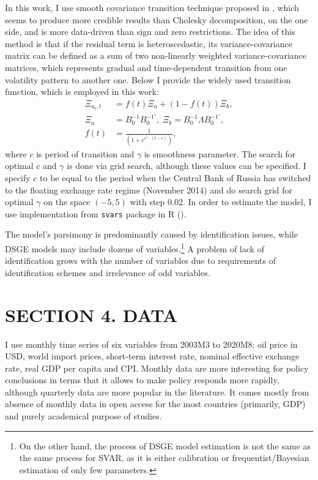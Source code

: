 \documentclass[12pt, a4paper]{extarticle}
\begin{document}
In this work, I use smooth covariance transition technique proposed in \cite{Luetkepohl2017}, which seems to produce more credible results than Cholesky decomposition, on the one side, and is more data-driven than sign and zero restrictions. The idea of this method is that if the residual term is heteroscedastic, its variance-covariance matrix can be defined as a sum of two non-linearly weighted variance-covariance matrices, which represents gradual and time-dependent transition from one volatility pattern to another one. Below I provide the widely used transition function, which is employed in this work:
\begin{align}
	\Xi_{u_t, t} &= f(t)\Xi_a + (1 - f(t))\Xi_b,\\
	\Xi_a &= B_0^{-1}B_0^{-1'}, \; \Xi_b = B_0^{-1}\Lambda B_0^{-1'},\\
	f(t) &= \frac{1}{(1 + e^{e^\gamma \cdot (t - c)})},
\end{align}
where $c$ is period of transition and $\gamma$ is smoothness parameter. The search for optimal $c$ and $\gamma$ is done via grid search, although these values can be specified. I specify $c$ to be equal to the period when the Central Bank of Russia has switched to the floating exchange rate regime (November 2014) and do search grid for optimal $\gamma$ on the space $(-5,5)$ with step $0.02$. In order to estimate the model, I use implementation from \texttt{svars} package in R (\cite{Lange2021}).

The model's parsimony is predominantly caused by identification issues, while DSGE models may include dozens of variables.\footnote{On the other hand, the process of DSGE model estimation is not the same as the same process for SVAR, as it is either calibration or frequentist/Bayesian estimation of only few parameters.} A problem of lack of identification grows with the number of variables due to requirements of identification schemes and irrelevance of odd variables.

\clearpage
\section*{SECTION 4. DATA}
\setcounter{section}{2}

I use monthly time series of six variables from 2003M3 to 2020M8: oil price in USD, world import prices, short-term interest rate, nominal effective exchange rate, real GDP per capita and CPI. Monthly data are more interesting for policy conclusions in terms that it allows to make policy responds more rapidly, although quarterly data are more popular in the literature. It comes mostly from absence of monthly data in open access for the most countries (primarily, GDP) and purely academical purpose of studies.
\end{document}
